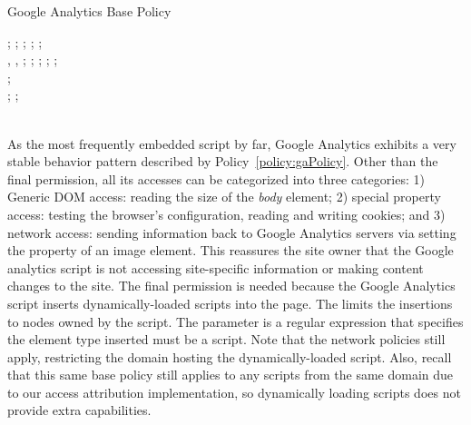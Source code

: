 \begin{algorithm}[bt]
	\setcounter{algorithm}{0}
  \caption{Google Analytics Base Policy}
  \label{policy:gaPolicy}\small\raggedright
  ; ; ;
  ; ; \\
  \vspace*{1ex}
  , , ; ; ;
  ; ;  \\ 
  ;  \\
  \vspace*{1ex}
  ; ;  \\
  \vspace*{1ex}
  \\
  \hspace*{2em}
\end{algorithm}

As the most frequently embedded script by far, Google Analytics exhibits
a very stable behavior pattern described by
Policy~\ref{policy:gaPolicy}.  Other than the final permission, all its
accesses can be categorized into three categories: 1) Generic DOM
access: reading the size of the \emph{body} element; 2) special property
access: testing the browser's configuration, reading and writing
cookies; and 3) network access: sending information back to Google
Analytics servers via setting the  property of an image
element.  This reassures the site owner that the Google analytics script
is not accessing site-specific information or making content changes to
the site.  The final permission is needed because the Google Analytics
script inserts dynamically-loaded scripts into the page.  The
\policy{\[o\]} limits the insertions to nodes owned by the script.  The
parameter is a regular expression that specifies the element type
inserted must be a script.  Note that the network policies still apply,
restricting the domain hosting the dynamically-loaded script.  Also,
recall that this same base policy still applies to any scripts from the
same domain due to our access attribution implementation, so dynamically
loading scripts does not provide extra capabilities.

